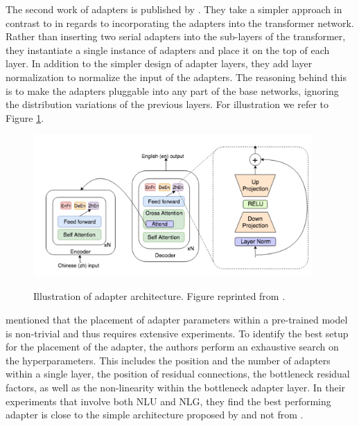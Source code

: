The second work of adapters is published by . They take a simpler approach in contrast to  in regards to incorporating the adapters into the transformer network. Rather than inserting two serial adapters into the sub-layers of the transformer, they instantiate a single instance of adapters and place it on the top of each layer. In addition to the simpler design of adapter layers, they add layer normalization to normalize the input of the adapters. The reasoning behind this is to make the adapters pluggable into any part of the base networks, ignoring the distribution variations of the previous layers. For illustration we refer to Figure \ref{img:ada_bapna}.

\begin{figure}[h]
    {\includegraphics[width=0.95\textwidth]{img/adapter_bapna.png}}
    \centering
    \caption{Illustration of adapter architecture. Figure reprinted from .}
    \label{img:ada_bapna}
\end{figure}

 mentioned that the placement of adapter parameters within a pre-trained model is non-trivial and thus requires extensive experiments. To identify the best setup for the placement of the adapter, the authors perform an exhaustive search on the hyperparameters. This includes the position and the number of adapters within a single layer, the position of residual connections, the bottleneck residual factors, as well as the non-linearity within the bottleneck adapter layer. In their experiments that involve both NLU and NLG, they find the best performing adapter is close to the simple architecture proposed by  and not from .

